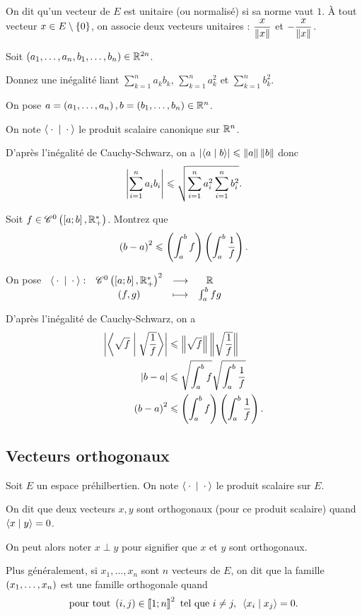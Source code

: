On dit qu'un vecteur de \(E\) est unitaire (ou normalisé) si sa norme vaut \(1\). À tout vecteur \(x\in E\setminus\left\lbrace0\right\rbrace\), on associe deux vecteurs unitaires : \(\dfrac{x}{\norme{x}}\) et \(-\dfrac{x}{\norme{x}}\).

\begin{exo}
Soit \(\left(a_1,\dots,a_n,b_1,\dots,b_n\right)\in\mathbb{R}^{2n}\).

Donnez une inégalité liant \(\sum_{k=1}^na_kb_k\), \(\sum_{k=1}^na_k^2\) et \(\sum_{k=1}^nb_k^2\).
\end{exo}

\begin{corr}
On pose \(a=\left(a_1,\dots,a_n\right),b=\left(b_1,\dots,b_n\right)\in\mathbb{R}^n\).

On note \(\ps{}{}\) le produit scalaire canonique sur \(\mathbb{R}^n\).

D'après l'inégalité de Cauchy-Schwarz, on a \(\abs{\ps{a}{b}}\leq\norme{a}\norme{b}\) donc \[\left\lvert\sum_{i=1}^na_ib_i\right\rvert\leqslant\sqrt{\sum_{i=1}^na_i^2\sum_{i=1}^nb_i^2}.\]
\end{corr}

\begin{exo}
Soit \(f\in\mathscr{C}^{0}\left(\left[a;b\right],\mathbb{R}_+^*\right)\). Montrez que \[\left(b-a\right)^2\leqslant\left(\int_a^bf\right)\left(\int_a^b\dfrac{1}{f}\right).\]
\end{exo}

\begin{corr}
On pose \(\fonction{\ps{}{}}{\ensclasse{0}{\intervii{a}{b}}{\Rps}^2}{\R}{\paren{f,g}}{\int_a^bfg}\)

D'après l'inégalité de Cauchy-Schwarz, on a \[\begin{aligned}
\abs{\ps{\sqrt{f}}{\sqrt{\dfrac{1}{f}}}}&\leq\norme{\sqrt{f}}\norme{\sqrt{\dfrac{1}{f}}} \\
\abs{b-a}&\leq\sqrt{\int_a^bf}\sqrt{\int_a^b\dfrac{1}{f}} \\
\paren{b-a}^2&\leq\paren{\int_a^bf}\paren{\int_a^b\dfrac{1}{f}}.
\end{aligned}\]
\end{corr}

\subsection{Vecteurs orthogonaux}

\begin{defi}
Soit \(E\) un espace préhilbertien. On note \(\ps{}{}\) le produit scalaire sur \(E\).

On dit que deux vecteurs \(x,y\) sont orthogonaux (pour ce produit scalaire) quand \(\ps{x}{y}=0\).

On peut alors noter \(x\perp y\) pour signifier que \(x\) et \(y\) sont orthogonaux.

Plus généralement, si \(x_1,\dots,x_n\) sont \(n\) vecteurs de \(E\), on dit que la famille \(\left(x_1,\dots,x_n\right)\) est une famille orthogonale quand \[\quantifs{\tpt\paren{i,j}\in\interventierii{1}{n}^2\text{ tel que }i\not=j}\ps{x_i}{x_j}=0.\]
\end{defi}

